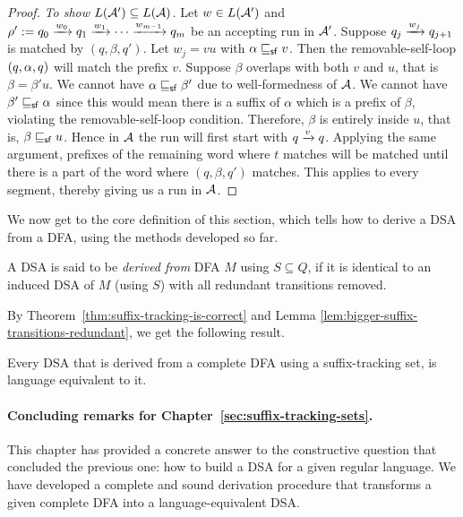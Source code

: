 \begin{proof}
  \emph{To show $L(\mathcal{A}') \subseteq L(\mathcal{A})$.} Let $w \in L(\mathcal{A}')$ and
  $\rho' := q_0 \xrightarrow{w_0} q_1 \xrightarrow{w_1} \cdots \xrightarrow{w_{m-1}} q_m$ be
  an accepting run in $\mathcal{A}'$. Suppose $q_j \xrightarrow{w_j} q_{j+1}$ is
  matched by $(q, \beta, q')$. Let $w_j = v u $ with $\alpha \sqsubseteq_{\mathsf {sf}} v$. Then
  the removable-self-loop $(q, \alpha, q)$ will match the prefix
  $v$. Suppose $\beta$ overlaps with both $v$ and $u$, that is $\beta
  = \beta' u$. We cannot have $\alpha \sqsubseteq_{\mathsf {sf}} \beta'$ due to
  well-formedness of $\mathcal{A}$. We cannot have $\beta' \sqsubseteq_{\mathsf {sf}} \alpha$ since
  this would mean there is a suffix of $\alpha$ which is a prefix of $\beta$,
  violating the removable-self-loop condition.  Therefore,
  $\beta$ is entirely inside $u$, that is, $\beta \sqsubseteq_{\mathsf {sf}}
  u$. Hence in $\mathcal{A}$ the run will first start with $q \xrightarrow{v}
  q$. Applying the same
  argument, prefixes of the remaining word where 
  $t$ matches will be matched until there is a part of the word where
  $(q, \beta, q')$ matches. This applies to every segment, thereby giving
  us a run in $\mathcal{A}$.
\end{proof}


We now get to the core definition of this section, which tells how to
derive a DSA from a DFA, using the methods developed so far.

\begin{definition} \label{def:derived-dsa}
  A DSA is said to be \emph{derived from} DFA $M$ using
  $S \subseteq Q$, if it is identical to an induced DSA of $M$
  (using $S$) with all redundant transitions removed.
\end{definition}

By Theorem~\ref{thm:suffix-tracking-is-correct} and Lemma
\ref{lem:bigger-suffix-transitions-redundant}, we get the following
result.

\begin{theorem}
  Every DSA that is derived from a complete DFA using a suffix-tracking set, is language equivalent
  to it.
\end{theorem}




\paragraph*{Concluding remarks for Chapter~\ref{sec:suffix-tracking-sets}.} This chapter has provided a concrete answer to the constructive question that concluded the previous one: how to build a DSA for a given regular language. We have developed a complete and sound derivation procedure that transforms a given complete DFA into a language-equivalent DSA.%

